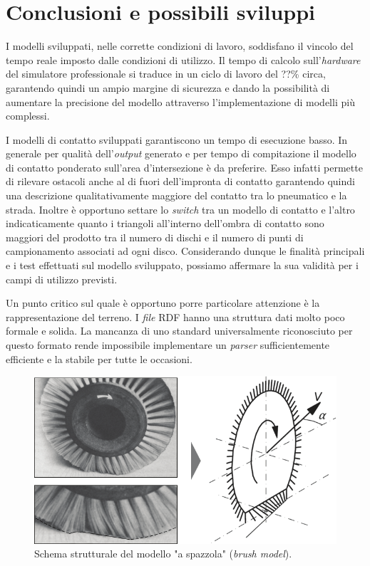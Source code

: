 \chapter{Conclusioni e possibili sviluppi}
\label{Conclusione}
%
I modelli sviluppati, nelle corrette condizioni di lavoro, soddisfano il vincolo del tempo reale imposto dalle condizioni di utilizzo. Il tempo di calcolo sull'\textit{hardware} del simulatore professionale si traduce in un ciclo di lavoro del ??\% circa, garantendo quindi un ampio margine di sicurezza e dando la possibilità di aumentare la precisione del modello attraverso l'implementazione di modelli più complessi.

I modelli di contatto sviluppati garantiscono un tempo di esecuzione basso. In generale per qualità dell'\textit{output} generato e per tempo di compitazione il modello di contatto ponderato sull'area d'intersezione è da preferire. Esso infatti permette di rilevare ostacoli anche al di fuori dell'impronta di contatto garantendo quindi una descrizione qualitativamente maggiore del contatto tra lo pneumatico e la strada. Inoltre è opportuno settare lo \textit{switch} tra un modello di contatto e l'altro indicaticamente quanto i triangoli all'interno dell'ombra di contatto sono maggiori del prodotto tra il numero di dischi e il numero di punti di campionamento associati ad ogni disco. Considerando dunque le finalità principali e i test effettuati sul modello sviluppato, possiamo affermare la sua validità per i campi di utilizzo previsti.

Un punto critico sul quale è opportuno porre particolare attenzione è la rappresentazione del terreno. I \textit{file} \ac{RDF} hanno una struttura dati molto poco formale e solida. La mancanza di uno standard universalmente riconosciuto per questo formato rende impossibile implementare un \textit{parser} sufficientemente efficiente e la stabile per tutte le occasioni.

\begin{figure}
	\centering
	\includegraphics[width=0.7\linewidth]{Figures/brush_model}
	\caption{Schema strutturale del modello "a spazzola" (\textit{brush model}). }
	\label{brushmodel}
\end{figure}

